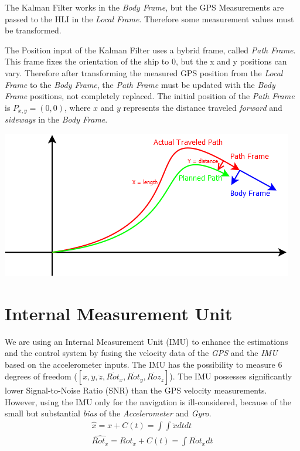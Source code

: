 The Kalman Filter works in the \emph{Body Frame}, but the GPS Measurements are passed to the HLI in the \emph{Local Frame}. Therefore some measurement values must be transformed.

The Position input of the Kalman Filter uses a hybrid frame, called \emph{Path Frame}. This frame fixes the orientation of the ship to 0, but the x and y positions can vary. Therefore after transforming the measured GPS position from the \emph{Local Frame} to the \emph{Body Frame}, the \emph{Path Frame} must be updated with the \emph{Body Frame} positions, not completely replaced. The initial position of the \emph{Path Frame} is $P_{x,y} = (0, 0)$, where $x$ and $y$ represents the distance traveled \emph{forward} and \emph{sideways} in the \emph{Body Frame}.

\includegraphics[width = \textwidth]{img/ControlStrategyFigures/PathFrame.png}

\section{Internal Measurement Unit}

We are using an Internal Measurement Unit (IMU) to enhance the estimations and the control system by fusing the velocity data of the \emph{GPS} and the \emph{IMU} based on the accelerometer inputs.
The IMU has the possibility to measure 6 degrees of freedom ($[\ddot{x}, \ddot{y}, \ddot{z}, \dot{Rot_x}, \dot{Rot_y}, \dot{Roz_z}]$). The IMU possesses significantly lower Signal-to-Noise Ratio (SNR) than the GPS velocity measurements. However, using the IMU only for the navigation is ill-considered, because of the small but substantial \emph{bias} of the \emph{Accelerometer} and \emph{Gyro}.
\begin{align}
\hat{x} = x + C(t) = \int \int \ddot{x} dt dt \\
\hat{Rot_x} = Rot_x + C(t) = \int \dot{Rot_x} dt
\end{align}

